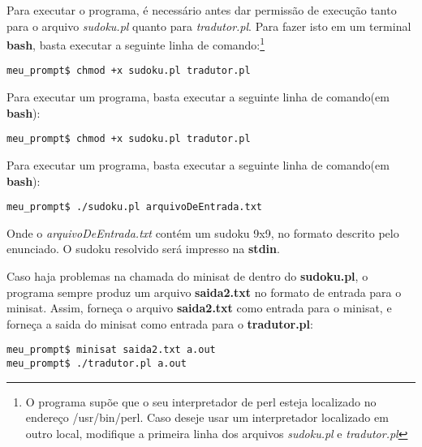 \documentclass[11pt]{article}
\begin{document}
Para executar o programa, é necessário antes dar permissão de execução tanto para o arquivo \emph{sudoku.pl} quanto para \emph{tradutor.pl}. Para fazer isto em um terminal \textbf{\color{red}bash}, basta executar a seguinte linha de comando:\footnote{O programa supõe que o seu interpretador de perl esteja localizado no endereço {\color{red}/usr/bin/perl}. Caso deseje usar um interpretador localizado em outro local, modifique a primeira linha dos arquivos \emph{sudoku.pl} e \emph{tradutor.pl}}

\begin{verbatim}
meu_prompt$ chmod +x sudoku.pl tradutor.pl
\end{verbatim}

Para executar um programa, basta executar a seguinte linha de comando(em \textbf{\color{red}bash}):


\begin{verbatim}
meu_prompt$ chmod +x sudoku.pl tradutor.pl
\end{verbatim}

Para executar um programa, basta executar a seguinte linha de comando(em \textbf{\color{red}bash}):

\begin{verbatim}
meu_prompt$ ./sudoku.pl arquivoDeEntrada.txt
\end{verbatim}

Onde o \emph{arquivoDeEntrada.txt} contém um sudoku 9x9, no formato descrito pelo enunciado. O sudoku resolvido será impresso na \textbf{\color{red}stdin}.

Caso haja problemas na chamada do minisat de dentro do \textbf{sudoku.pl}, o programa sempre produz um arquivo \textbf{\color{red}saida2.txt} no formato de entrada para o minisat. Assim, forneça o arquivo \textbf{\color{red}saida2.txt} como entrada para o minisat, e forneça a saida do minisat como entrada para o \textbf{tradutor.pl}:


\begin{verbatim}
meu_prompt$ minisat saida2.txt a.out
meu_prompt$ ./tradutor.pl a.out
\end{verbatim}
\end{document}
